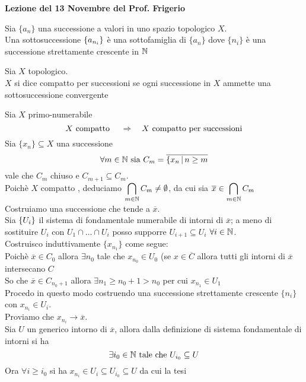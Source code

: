 

\textbf{Lezione del 13 Novembre del Prof. Frigerio}
\begin{defn}[Sottosuccessione]\bianco
Sia $\{ a_n\}$ una successione a valori in uno spazio topologico $X$.\\
Una sottosuccessione $\displaystyle \{ a_{n_i}\}$ \`e una sottofamiglia di $\{a_n\}$ dove $\{ n_i\}$ \`e una successione strettamente crescente in $\mathbb{N}$
\end{defn}
\spazio
\begin{defn}Sia $X$ topologico.\\
$X$ si dice compatto per successioni se ogni successione in $X$ ammette una sottosuccessione convergente
\end{defn}
\begin{prop}Sia $X$ primo-numerabile
$$ X \text{ compatto } \quad \Rightarrow \quad X \text{ compatto per successioni}$$
\proof Sia $\{x_n\}\subseteq X$ una successione
$$\forall m \in \mathbb{N} \text{ sia } C_m = \overline{\{ x_n \, \vert \, n \geq m }$$ vale che $C_m$ chiuso e $C_{m+1}\subseteq C_m$.\\
Poich\`e $X$ compatto , deduciamo $\displaystyle \bigcap_{m \in \mathbb{N}} C_m \neq \emptyset$, da cui sia $ \displaystyle \overline{x}\in \bigcap_{m \in \mathbb{N}} C_m$\\
Costruiamo una successione che tende a $\overline{x}$.\\
Sia $\displaystyle \{ U_i\}$ il sistema di fondamentale numerabile di  intorni di $\overline{x}$; a meno di sostituire $U_i$ con $ U_1 \cap \dots \cap U_i$ posso supporre $U_{i+1 } \subseteq U_i$ $\forall i\in \mathbb{N}$.\\
Costruisco induttivamente $\{x_{n_1}\}$ come segue:\\
Poich\`e $\overline{x}\in C_0$ allora $\exists n_0$ tale che $x_{n_0}\in U_0$ (se  $x\in \overline{C}$ allora tutti gli intorni di $\overline{x}$ intersecano $C$\\
So che $\overline{x}\in C_{n_0+1} $ allora $\exists n_1 \geq n_0+1 > n_0$ per cui $x_{n_1}\in U_1$\\
Procedo in questo modo costruendo una successione strettamente crescente $\{ n_i\}$ con  $x_{n_i} \in U_i$.\\
Proviamo che $x_{n_i}\to \overline{x}$.\\
Sia $U$ un generico intorno di $\overline{x}$, allora dalla definizione di sistema fondamentale di intorni si ha $$\exists i_0 \in \mathbb{N} \text{ tale che }U_{i_0} \subseteq U$$
Ora $\forall i\geq i_0 $ si ha $x_{n_i} \in U_i \subseteq U_{i_0} \subseteq U $ da cui la tesi
\endproof
\end{prop}
